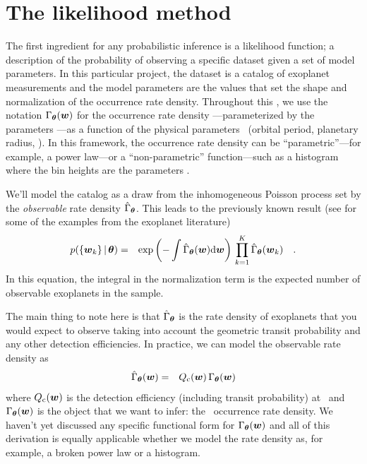 \section{The likelihood method}

The first ingredient for any probabilistic inference is a likelihood function;
a description of the probability of observing a specific dataset given a set
of model parameters.
In this particular project, the dataset is a catalog of exoplanet measurements
and the model parameters are the values that set the shape and normalization
of the occurrence rate density.
Throughout this \paper, we use the notation $\Gamma_{{\boldsymbol{{\theta}}}}({{\boldsymbol{w}}})$ for the
occurrence rate density \rate---parameterized by the parameters \ratepars---as
a function of the physical parameters \entry\ (orbital period, planetary
radius, \etc).
In this framework, the occurrence rate density can be ``parametric''---for
example, a power law---or a ``non-parametric'' function---such as a histogram
where the bin heights are the parameters \ratepars.

We'll model the catalog as a draw from the inhomogeneous Poisson process set
by the \emph{observable} rate density $\hat{\Gamma}_{{\boldsymbol{{\theta}}}}$.
This leads to the previously known result (see \citealt{Tabachnik:2002,
Youdin:2011} for some of the examples from the exoplanet literature)
\begin{eqnarray}\eqlabel{poisson-like}
p(\{\entry_k\}\,|\,\ratepars) &=&
    \exp\left(-\int \obs{\rate}_\ratepars (\entry) \dd\entry\right) \,
    \prod_{k=1}^K \obs{\rate}_\ratepars (\entry_k)\quad.
\end{eqnarray}
In this equation, the integral in the normalization term is the expected
number of observable exoplanets in the sample.

The main thing to note here is that $\hat{\Gamma}_{{\boldsymbol{{\theta}}}}$ is the rate
density of exoplanets that you would expect to observe taking into account the
geometric transit probability and any other detection efficiencies.
In practice, we can model the observable rate density as
\begin{eqnarray}\eqlabel{obs-rate}
\obs{\rate}_\ratepars(\entry) &=&
    \completeness(\entry)\,\rate_\ratepars(\entry)
\end{eqnarray}
where ${Q_\mathrm{c}}({{\boldsymbol{w}}})$ is the detection efficiency (including transit
probability) at \entry\ and $\Gamma_{{\boldsymbol{{\theta}}}}({{\boldsymbol{w}}})$ is the object that we
want to infer: the \True\ occurrence rate density.
We haven't yet discussed any specific functional form for
$\Gamma_{{\boldsymbol{{\theta}}}}({{\boldsymbol{w}}})$ and all of this derivation is equally applicable
whether we model the rate density as, for example, a broken power law or a
histogram.

